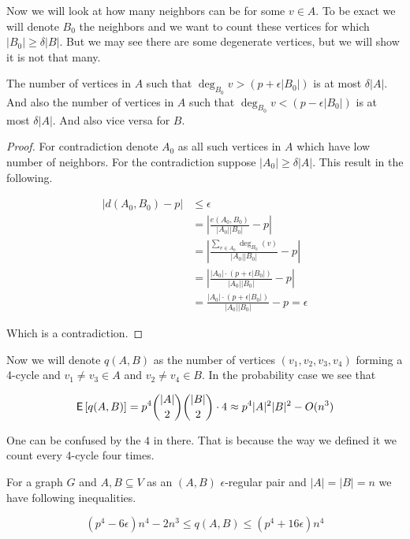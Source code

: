 Now we will look at how many neighbors can be for some $v \in A$. To be exact we will denote $B_{0}$ the neighbors and we want to count these vertices for which $|B_{0}| \geq \delta |B|$. But we may see there are some degenerate vertices, but we will show it is not that many.

\begin{lemma}
	The number of vertices in $A$ such that $\deg_{B_{0}}v > (p + \epsilon |B_{0}|)$ is at most $\delta |A|$. And also the number of vertices in $A$ such that $\deg_{B_{0}}v < (p - \epsilon |B_{0}|)$ is at most $\delta |A|$. And also vice versa for $B$.
\end{lemma}

\begin{proof}
	For contradiction denote $A_{0}$ as all such vertices in $A$ which have low number of neighbors. For the contradiction suppose $|A_{0}| \geq \delta |A|$. This result in the following.
	
	$$
	\begin{aligned}
		|d(A_{0}, B_{0}) - p| &\leq \epsilon \\
		 &= \left| \frac{e(A_{0},B_{0})}{|A_{0}| |B_{0}|} - p \right| \\
		 &= \left| \frac{\sum_{v \in A_{0}} \deg_{B_{0}}(v)}{|A_{0}| |B_{0}|} - p \right| \\
		 &= \left| \frac{|A_{0}| \cdot (p+ \epsilon |B_{0}|)}{|A_{0}| |B_{0}|} - p \right| \\
		 &= \frac{|A_{0}| \cdot (p+ \epsilon |B_{0}|)}{|A_{0}| |B_{0}|} - p = \epsilon
	\end{aligned}
	$$
	
	Which is a contradiction.
\end{proof}

Now we will denote $q(A,B)$ as the number of vertices $(v_1, v_2, v_3, v_4)$ forming a 4-cycle and $v_1 \neq v_3 \in A$ and $v_2 \neq v_4 \in B$. In the probability case we see that 

$$
\operatorname{\textsf{E}\,} [q(A,B)] = p^4 \binom{|A|}{2} \binom{|B|}{2} \cdot 4 \approx p^4 |A|^2 |B|^2 - O(n^3)
$$

One can be confused by the $4$ in there. That is because the way we defined it we count every 4-cycle four times.

\begin{lemma}
	For a graph $G$ and $A, B \subseteq V$ as an $(A, B)$ $\epsilon$-regular pair and $|A| = |B| = n$ we have following inequalities.
	
	$$
	(p^4 - 6 \epsilon)n^4 - 2n^3 \leq q(A,B) \leq (p^4 + 16 \epsilon) n^4
	$$
\end{lemma}

